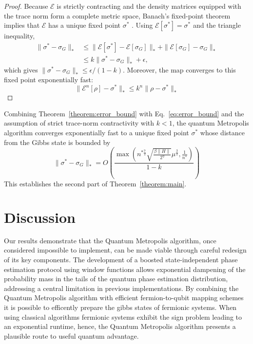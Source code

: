 \documentclass[aps,floatfix,10pt,amssymb,amsfont,amsmath,superscriptaddress,float,nofootinbib,longbibliography,nobalancelastpage,twocolumn]{revtex4-2}
\begin{document}
 \begin{proof}
Because $\mathcal{E}$ is strictly contracting and the density matrices equipped with the trace norm form a complete metric space, Banach's fixed-point theorem implies that $\mathcal{E}$ has a unique fixed point $\sigma^*$ \cite{Mart_nez_Pe_a_2023,Raginsky_2002}. Using $\mathcal{E}[\sigma^*]=\sigma^*$ and the triangle inequality,
\begin{align}
 \|\sigma^*-\sigma_G\|_*
 &\leq \|\mathcal{E}[\sigma^*]-\mathcal{E}[\sigma_G]\|_*+\|\mathcal{E}[\sigma_G]-\sigma_G\|_*\\
 &\leq k\|\sigma^*-\sigma_G\|_*+\epsilon,
\end{align}
which gives $\|\sigma^*-\sigma_G\|_*\leq\epsilon/(1-k)$. Moreover, the map converges to this fixed point exponentially fast:
\begin{equation}
     \|\mathcal{E}^n[\rho] -\sigma^*\|_* \leq k^n\| \rho - \sigma^*\|_*
\end{equation}
 \end{proof}
Combining Theorem~\ref{theorem:error_bound} with Eq.~\eqref{eq:error_bound} and the assumption of strict trace-norm contractivity with $k<1$, the quantum Metropolis algorithm converges exponentially fast to a unique fixed point $\sigma^*$ whose distance from the Gibbs state is bounded by
\begin{equation}
    \|\sigma^*-\sigma_G\|_* = 
    O\left(\frac{\max\left( n^{*\frac{7}{2}}\sqrt{\frac{\beta\|H\| }{2^{\eta}}}\mu^{\frac{3}{2}},\frac{1}{n^*}\right)}{1-k}\right)
\end{equation}
This establishes the second part of Theorem~\ref{theorem:main}.
\section{Discussion}
\label{section:discussion}
Our results demonstrate that the Quantum Metropolis algorithm, once considered impossible to implement, can be made viable through careful redesign of its key components. The development of a boosted state-independent phase estimation protocol using window functions allows exponential dampening of the probability mass in the tails of the quantum phase estimation distribution, addressing a central limitation in previous implementations. By combining the Quantum Metropolis algorithm with efficient fermion-to-qubit mapping schemes \cite{} it is possible to efficently prepare the gibbs states of fermionic systems. When using classical algorithms fermionic systems exhibit the sign problem \cite{} leading to an exponential runtime, hence, the Quantum Metropolis algorithm presents a plausible route to useful quantum advantage.
\end{document}
